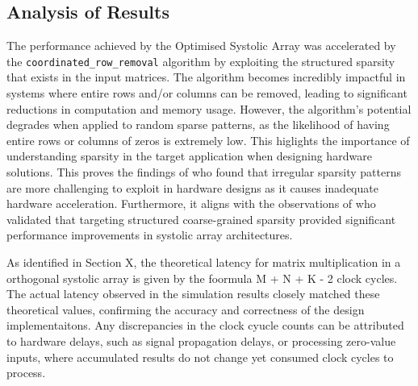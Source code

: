 \documentclass[12pt, a4paper, ukenglish]{article}
\begin{document}
    \subsection{Analysis of Results} \label{sec: analysis}


    The performance achieved by the Optimised Systolic Array was accelerated by the \newline \texttt{coordinated\_row\_removal} algorithm by exploiting the structured sparsity that exists in the input matrices. The algorithm becomes incredibly impactful in systems where entire rows and/or columns can be removed, leading to significant reductions in computation and memory usage. However, the algorithm's potential degrades when applied to random sparse patterns, as the likelihood of having entire rows or columns of zeros is extremely low. This higlights the importance of understanding sparsity in the target application when designing hardware solutions. This proves the findings of \textcite{sun_sense_2023} who found that irregular sparsity patterns are more challenging to exploit in hardware designs as it causes inadequate hardware acceleration. Furthermore, it aligns with the observations of \textcite{palacios_systolic_2025} who validated that targeting structured coarse-grained sparsity provided significant performance improvements in systolic array architectures.

    As identified in Section X, the theoretical latency for matrix multiplication in a orthogonal systolic array is given by the foormula M + N + K - 2 clock cycles. The actual latency observed in the simulation results closely matched these theoretical values, confirming the accuracy and correctness of the design implementaitons. Any discrepancies in the clock cyucle counts can be attributed to hardware delays, such as signal propagation delays, or processing zero-value inputs, where accumulated results do not change yet consumed clock cycles to process.
\end{document}

